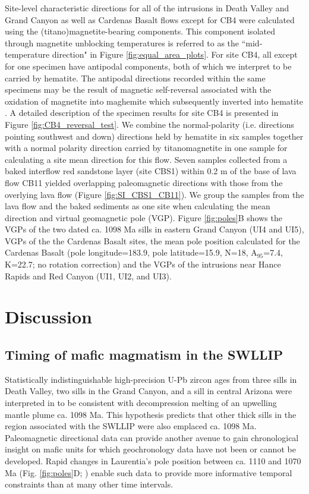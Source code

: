 Site-level characteristic directions for all of the intrusions in Death Valley and Grand Canyon as well as Cardenas Basalt flows except for CB4 were calculated using the (titano)magnetite-bearing components. This component isolated through magnetite unblocking temperatures is referred to as the ``mid-temperature direction" in Figure \ref{fig:equal_area_plots}. For site CB4, all except for one specimen have antipodal components, both of which we interpret to be carried by hematite. The antipodal directions recorded within the same specimens may be the result of magnetic self-reversal associated with the oxidation of magnetite into maghemite which subsequently inverted into hematite \citep{Swanson-Hysell2011a}. A detailed description of the specimen results for site CB4 is presented in Figure \ref{fig:CB4_reversal_test}. We combine the normal-polarity (i.e. directions pointing southwest and down) directions held by hematite in six samples together with a normal polarity direction carried by titanomagnetite in one sample for calculating a site mean direction for this flow. Seven samples collected from a baked interflow red sandstone layer (site CBS1) within 0.2 m of the base of lava flow CB11 yielded overlapping paleomagnetic directions with those from the overlying lava flow (Figure \ref{fig:SI_CBS1_CB11}). We group the samples from the lava flow and the baked sediments as one site when calculating the mean direction and virtual geomagnetic pole (VGP). Figure \ref{fig:poles}B shows the VGPs of the two dated ca. 1098 Ma sills in eastern Grand Canyon (UI4 and UI5), VGPs of the the Cardenas Basalt sites, the mean pole position calculated for the Cardenas Basalt (pole longitude=183.9\textdegree, pole latitude=15.9\textdegree, N=18, A$_{95}$=7.4\textdegree, K=22.7; no rotation correction) and the VGPs of the intrusions near Hance Rapids and Red Canyon (UI1, UI2, and UI3). 

\section{Discussion}

\subsection{Timing of mafic magmatism in the SWLLIP}

Statistically indistinguishable high-precision U-Pb zircon ages from three sills in Death Valley, two sills in the Grand Canyon, and a sill in central Arizona were interpreted in \cite{Mohr2024a} to be consistent with decompression melting of an upwelling mantle plume ca. 1098 Ma. This hypothesis predicts that other thick sills in the region associated with the SWLLIP were also emplaced ca. 1098 Ma. Paleomagnetic directional data can provide another avenue to gain chronological insight on mafic units for which geochronology data have not been or cannot be developed. Rapid changes in Laurentia's pole position between ca. 1110 and 1070 Ma (Fig. \ref{fig:poles}D; \citealp{Swanson-Hysell2019a}) enable such data to provide more informative temporal constraints than at many other time intervals.


